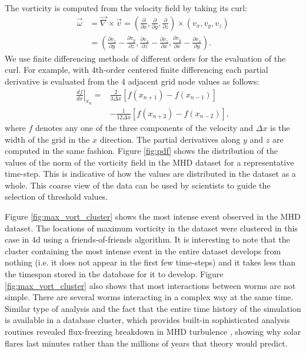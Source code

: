 \documentclass{sig-alternate}
\begin{document}
The vorticity is computed from the velocity field by taking its curl:
\begin{align}
\vec{\omega} &= \vec{\nabla} \times \vec{v} = \left( \frac{\partial}{\partial x}, \frac{\partial}{\partial y}, \frac{\partial}{\partial z} \right) 
\times \nonumber \left( v_x, v_y, v_z \right)\\
&= \left( \frac{\partial v_z}{\partial y} - \frac{\partial v_y}{\partial z}, \frac{\partial v_x}{\partial z} - \frac{\partial v_z}{\partial x}, 
\frac{\partial v_y}{\partial x} - \frac{\partial v_x}{\partial y} \right).
\label{eq:curl}
\end{align}
We use finite differencing methods of
different orders for the evaluation of the curl. For example, with 4th-order centered finite differencing each partial derivative is evaluated from the 4
adjacent grid node values as follows:  
\begin{align} 
\left.\frac{df}{dx}\right|_{x_n} = &\frac{2}{3\Delta x}[f(x_{n+1})-f(x_{n-1})]\nonumber\\ 
&-\frac{1}{12\Delta x}[f(x_{n+2})-f(x_{n-2})],
\end{align}
where $f$ denotes any one of the three components of the velocity and $\Delta x$ is the width of the grid in the $x$ direction. The partial derivatives
along $y$ and $z$ are computed in the same fashion. 
Figure \ref{fig:pdf} shows the distribution of the values of the norm of the vorticity field in the MHD dataset for a representative time-step. This is indicative 
of how the values are distributed in the dataset as a whole.
This coarse view of the data can be used by scientists to guide the selection of threshold values.

Figure \ref{fig:max_vort_cluster} shows the most intense event observed in the MHD dataset. The locations of maximum vorticity in the dataset were clustered
in this case in 4d using a friends-of-friends algorithm. It is interesting to note that the cluster containing the most intense event in the entire dataset develops
from nothing (i.e. it does not appear in the first few time-steps) and it takes less than the timespan stored in the database for it to develop. 
Figure \ref{fig:max_vort_cluster} also shows that most interactions between worms are not simple. 
There are several worms interacting in a complex way at the same time. Similar type of analysis and the fact that the entire time history of the simulation
is available in a database cluster, which provides built-in sophisticated analysis routines revealed flux-freezing breakdown in MHD turbulence \cite{Eyink},
showing why solar flares last minutes rather than the millions of years that theory would predict.
\end{document}
